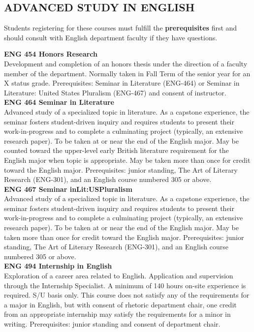 \documentclass[
  letterpaper,
]{scrbook}
\begin{document}
\subsection{ADVANCED STUDY IN ENGLISH}\label{advanced-study-in-english}

Students registering for these courses must fulfill the
\textbf{prerequisites} first and should consult with English department
faculty if they have questions.

\textbf{ENG 454 Honors Research}\\
Development and completion of an honors thesis under the direction of a
faculty member of the department. Normally taken in Fall Term of the
senior year for an X status grade. Prerequisites: Seminar in Literature
(ENG-464) or Seminar in Literature: United States Pluralism (ENG-467)
and consent of instructor.\\
\textbf{ENG 464 Seminar in Literature}\\
Advanced study of a specialized topic in literature. As a capstone
experience, the seminar fosters student-driven inquiry and requires
students to present their work-in-progress and to complete a culminating
project (typically, an extensive research paper). To be taken at or near
the end of the English major. May be counted toward the upper-level
early British literature requirement for the English major when topic is
appropriate. May be taken more than once for credit toward the English
major. Prerequisites: junior standing, The Art of Literary Research
(ENG-301), and an English course numbered 305 or above.\\
\textbf{ENG 467 Seminar inLit:USPluralism}\\
Advanced study of a specialized topic in literature. As a capstone
experience, the seminar fosters student-driven inquiry and requires
students to present their work-in-progress and to complete a culminating
project (typically, an extensive research paper). To be taken at or near
the end of the English major. May be taken more than once for credit
toward the English major. Prerequisites: junior standing, The Art of
Literary Research (ENG-301), and an English course numbered 305 or
above.\\
\textbf{ENG 494 Internship in English}\\
Exploration of a career area related to English. Application and
supervision through the Internship Specialist. A minimum of 140 hours
on-site experience is required. S/U basis only. This course does not
satisfy any of the requirements for a major in English, but with consent
of rhetoric department chair, one credit from an appropriate internship
may satisfy the requirements for a minor in writing. Prerequisites:
junior standing and consent of department chair.
\end{document}
